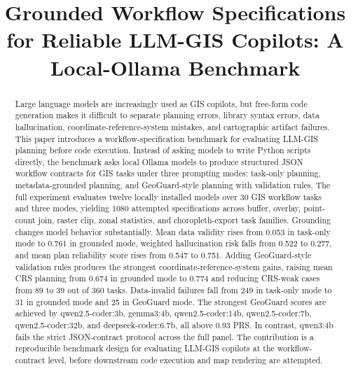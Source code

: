 \documentclass[]{interact}
\begin{document}

\title{Grounded Workflow Specifications for Reliable LLM-GIS Copilots: A Local-Ollama Benchmark}

\author{
}

\maketitle

\begin{abstract}
Large language models are increasingly used as GIS copilots, but free-form code generation makes it difficult to separate planning errors, library syntax errors, data hallucination, coordinate-reference-system mistakes, and cartographic artifact failures. This paper introduces a workflow-specification benchmark for evaluating LLM-GIS planning before code execution. Instead of asking models to write Python scripts directly, the benchmark asks local Ollama models to produce structured JSON workflow contracts for GIS tasks under three prompting modes: task-only planning, metadata-grounded planning, and GeoGuard-style planning with validation rules. The full experiment evaluates twelve locally installed models over 30 GIS workflow tasks and three modes, yielding 1080 attempted specifications across buffer, overlay, point-count join, raster clip, zonal statistics, and choropleth-export task families. Grounding changes model behavior substantially. Mean data validity rises from 0.053 in task-only mode to 0.761 in grounded mode, weighted hallucination risk falls from 0.522 to 0.277, and mean plan reliability score rises from 0.547 to 0.751. Adding GeoGuard-style validation rules produces the strongest coordinate-reference-system gains, raising mean CRS planning from 0.674 in grounded mode to 0.774 and reducing CRS-weak cases from 89 to 39 out of 360 tasks. Data-invalid failures fall from 249 in task-only mode to 31 in grounded mode and 25 in GeoGuard mode. The strongest GeoGuard scores are achieved by qwen2.5-coder:3b, gemma3:4b, qwen2.5-coder:14b, qwen2.5-coder:7b, qwen2.5-coder:32b, and deepseek-coder:6.7b, all above 0.93 PRS. In contrast, qwen3:4b fails the strict JSON-contract protocol across the full panel. The contribution is a reproducible benchmark design for evaluating LLM-GIS copilots at the workflow-contract level, before downstream code execution and map rendering are attempted.
\end{abstract}
\end{document}

